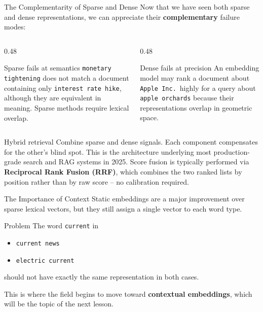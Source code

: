 \documentclass[aspectratio=169]{beamer}
\begin{document}
%
%
\begin{frame}{The Complementarity of Sparse and Dense}
Now that we have seen both sparse and dense representations, we can appreciate their
\textbf{complementary} failure modes:
\small 
\vspace{0.12cm}
\begin{columns}[T]
\begin{column}{0.48\textwidth}
\begin{block}{Sparse fails at semantics}
\texttt{monetary tightening} does not match a document containing only
\texttt{interest rate hike}, although they are equivalent in meaning.
Sparse methods require lexical overlap.
\end{block}
\end{column}
\begin{column}{0.48\textwidth}
\begin{block}{Dense fails at precision}
An embedding model may rank a document about \texttt{Apple Inc.}\ highly
for a query about \texttt{apple orchards} because their representations
overlap in geometric space.
\end{block}
\end{column}
\end{columns}
 
\vspace{0.18cm}
\begin{block}{Hybrid retrieval}
Combine sparse and dense signals. Each component compensates for the other's blind spot.
This is the architecture underlying most production-grade search and RAG systems in 2025.
Score fusion is typically performed via \textbf{Reciprocal Rank Fusion (RRF)}, which
combines the two ranked lists by position rather than by raw score -- no calibration required.
\end{block}
\end{frame}
%
%
\begin{frame}{The Importance of Context}
Static embeddings are a major improvement over sparse lexical vectors, but they still assign a single vector to each word type.

\vspace{0.15cm}
\begin{block}{Problem}
The word \texttt{current} in
\begin{itemize}
    \item \texttt{current news}
    \item \texttt{electric current}
\end{itemize}
should not have exactly the same representation in both cases.
\end{block}

\vspace{0.15cm}
This is where the field begins to move toward \textbf{contextual embeddings}, which will be the topic of the next lesson.
\end{frame}
\end{document}
